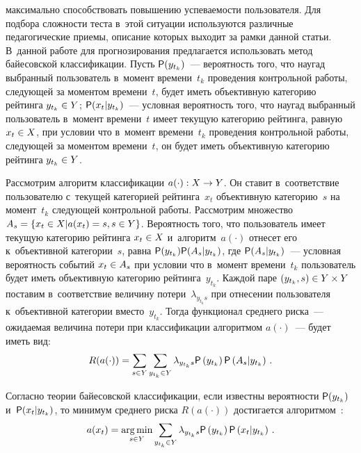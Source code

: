 \begin{multicols}{2}
\vspace*{11pt}

\noindent
  максимально способствовать повышению успеваемости пользователя. Для подбора 
слож\-ности теста в~этой 
ситуации используются различные педагогические приемы, описание 
которых выходит за рамки данной статьи. В~данной работе для прогнозирования 
предлагается использовать метод байесовской классификации. Пусть ${\sf P}(y_{t_k})$~--- 
вероятность того, что наугад выбранный пользователь в~момент времени~$t_k$ 
проведения контрольной работы, следующей за моментом времени~$t$, будет иметь 
объективную категорию рейтинга $y_{t_k}\hm\in Y$; ${\sf P}(x_t\vert y_{t_k})$~--- условная 
вероятность того, что на\-угад выбранный пользователь в~момент времени~$t$ имеет 
текущую категорию рейтинга, равную $x_t\hm\in X$, при условии что в~момент 
времени~$t_k$ проведения контрольной работы, следующей за моментом времени~$t$, он 
будет иметь объективную категорию рейтинга $y_{t_k}\hm\in Y$.
      
      Рассмотрим алгоритм классификации $a(\cdot): X\hm\to Y$. Он ставит 
в~соответствие пользователю с~текущей категорией рейтинга~$x_t$ объективную 
категорию~$s$ на момент~$t_k$ следующей контрольной работы. Рассмотрим множество 
$A_s\hm= \{x_t\hm\in X\vert a(x_t)\hm=s, s\hm\in Y\}$. Вероятность того, что пользователь 
имеет текущую категорию рейтинга $x_t\hm\in X$ и~алгоритм~$a(\cdot)$ отнесет его 
к~объективной категории~$s$, равна ${\sf P}(y_{t_k}){\sf P}(A_s\vert y_{t_k})$, 
где ${\sf P}(A_s\vert 
y_{t_k})$~--- условная вероятность событий $x_t\hm\in A_s$ при условии что в~момент 
времени~$t_k$ пользователь будет иметь объективную категорию рейтинга~$y_{t_k}$. 
Каждой паре $(y_{t_k},s)\hm\in Y\times Y$ поставим в~соответствие величину 
потери~$\lambda_{y_{t_k}s}$ при отнесении пользователя к~объективной категории 
вместо~$y_{t_k}$. Тогда функционал среднего риска~--- ожидаемая величина потери при 
классификации алгоритмом $a(\cdot)$~--- будет иметь вид:
      $$
      R(a(\cdot))=
      \sum\limits_{s\in Y} \sum\limits_{y_{t_k}\in Y} \lambda_{y_{t_k}s} {\sf P}\left( 
y_{t_k}\right) {\sf P}\left( A_s\vert y_{t_k}\right)\,.
      $$
      
      Согласно теории байесовской классификации, если известны вероятности 
${\sf P}(y_{t_k})$ и~${\sf P}(x_t\vert y_{t_k})$, то минимум среднего риска $R(a(\cdot))$ 
достигается алгоритмом~\cite{12-bos}:
      \begin{equation}
      a(x_t)=\mathop{\mathrm{arg}\,\mathrm{min}}\limits_{s\in Y} \sum\limits_{y_{t_k}\in Y} \lambda_{y_{t_k}s} 
      {\sf P}\left(  y_{t_k}\right) {\sf P}\left( x_t\vert y_{t_k}\right)\,.
      \label{e2-bos}
      \end{equation}
      

\end{multicols}
